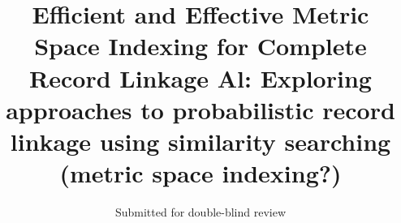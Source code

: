 \documentclass{llncs}
\begin{document}
\title{Efficient and Effective Metric Space Indexing for Complete
       Record Linkage
       Al: Exploring approaches to probabilistic record linkage using similarity searching (metric space indexing?) }

\author{Submitted for double-blind review}




\maketitle
\end{document}
